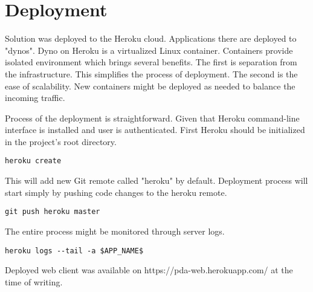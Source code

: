 
\section{Deployment}\label{sec:deployment}

Solution was deployed to the Heroku cloud.\cite{heroku}
Applications there are deployed to "dynos".
Dyno on Heroku is a virtualized Linux container.
Containers provide isolated environment which brings several benefits.
The first is separation from the infrastructure.
This simplifies the process of deployment.
The second is the ease of scalability.
New containers might be deployed as needed to balance the incoming traffic.

Process of the deployment is straightforward.
Given that Heroku command-line interface is installed and user is authenticated.
First Heroku should be initialized in the project's root directory\@.

\begin{Verbatim}[frame=single]
heroku create
\end{Verbatim}

This will add new Git remote called "heroku" by default.
Deployment process will start simply by pushing code changes to the heroku remote.

\begin{Verbatim}[frame=single]
git push heroku master
\end{Verbatim}

The entire process might be monitored through server logs.

\begin{Verbatim}[frame=single]
heroku logs --tail -a $APP_NAME$
\end{Verbatim}

Deployed web client was available on https://pda-web.herokuapp.com/ at the time of writing.